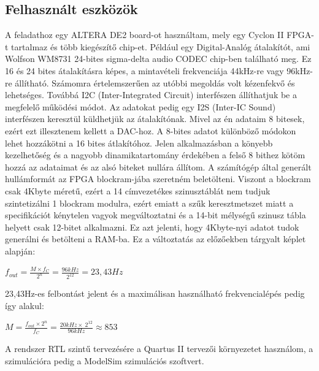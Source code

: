 \documentclass[a4paper,12pt]{article}
\begin{document}
	\subsection{Felhasznált eszközök}
	A feladathoz egy ALTERA DE2 board-ot használtam, mely egy Cyclon II FPGA-t tartalmaz és több kiegészítő chip-et. Például egy Digital-Analóg átalakítót, ami Wolfson WM8731 24-bites sigma-delta audio CODEC chip-ben található meg. Ez 16 és 24 bites átalakításra képes, a mintavételi frekvenciája 44kHz-re vagy 96kHz-re állítható. Számomra értelemszerűen az utóbbi megoldás volt kézenfekvő és lehetséges.
	Továbbá I2C (Inter-Integrated Circuit) interfészen állíthatjuk be a megfelelő működési módot. Az adatokat pedig egy I2S (Inter-IC Sound) interfészen keresztül küldhetjük az átalakítónak. Mivel az én adataim 8 bitesek, ezért ezt illesztenem kellett a DAC-hoz. A 8-bites adatot különböző módokon lehet hozzákötni a 16 bites átlakítóhoz. Jelen alkalmazásban a könyebb kezelhetőség és a nagyobb dinamikatartomány érdekében a felső 8 bithez kötöm hozzá az adataimat és az alsó biteket nullára állítom.
	A számítógép által generált hullámformát az FPGA blockram-jába szeretném beletölteni. Viszont a blockram csak 4Kbyte méretű, ezért a 14 címvezetékes szinusztáblát nem tudjuk szintetizálni 1 blockram modulra, ezért emiatt a szűk keresztmetszet miatt a specifikációt kénytelen vagyok megváltoztatni és a 14-bit mélységű szinusz tábla helyett csak 12-bitet alkalmazni. Ez azt jelenti, hogy 4Kbyte-nyi adatot tudok generálni és betölteni a RAM-ba. Ez a változtatás az előzőekben tárgyalt képlet alapján:

	\begin{center}
		$f_{out}=\frac{M\times f_C}{2^n}=\frac{96kHz}{2^{12}}=23,43Hz$
	\end{center}
	23,43Hz-es felbontást jelent és a maximálisan használható frekvencialépés pedig így alakul:
	\begin{center}
		$M=\frac{f_{out}\times2^n}{f_C}=\frac{20kHz\times\ 2^{12}}{96kHz}\approx853$
	\end{center}
	A rendszer RTL szintű tervezésére a Quartus II tervezői környezetet használom, a szimulációra pedig a ModelSim szimulációs szoftvert. 
	\newpage
\end{document}
